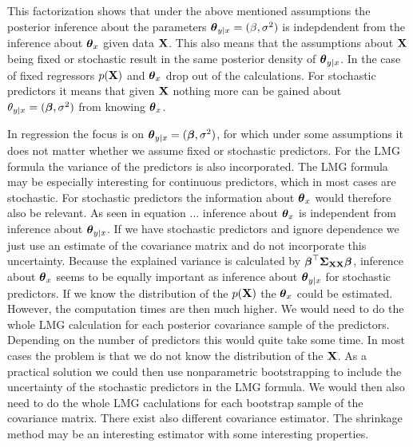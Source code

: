 \documentclass[11pt,a4paper,twoside]{book}\usepackage[]{graphicx}\usepackage[]{color}
\begin{document}
  This factorization shows that under the above mentioned assumptions the posterior inference about the parameters ${\boldsymbol{\theta}}{}_{y \mid x} = (\beta, \sigma^2)$ is indepdendent from the inference about ${\boldsymbol{\theta}}{}_{x}$ given data ${\mathbf{X}}$. This also means that the assumptions about ${\mathbf{X}}$ being fixed or stochastic result in the same posterior density of  ${\boldsymbol{\theta}}{}_{y \mid x}$. In the case of fixed regressors $p({\mathbf{X}})$ and ${\boldsymbol{\theta}}{}_{x}$ drop out of the calculations. For stochastic predictors it means that given ${\mathbf{X}}$ nothing more can be gained about $\theta_{y \mid x} = ({\boldsymbol{\beta}}, \sigma^2)$ from knowing ${\boldsymbol{\theta}}{}_{x}$. 
  
  In regression the focus is on ${\boldsymbol{\theta}}{}_{y \mid x} = ({\boldsymbol{\beta}}, \sigma^2)$, for which under some assumptions it does not matter whether we assume fixed or stochastic predictors. For the LMG formula the variance of the predictors is also incorporated. The LMG formula may be especially interesting for continuous predictors, which in most cases are stochastic. For stochastic predictors the information about ${\boldsymbol{\theta}}{}_{x}$ would therefore also be relevant.  As seen in equation ... inference about ${\boldsymbol{\theta}}{}_{x}$  is independent from inference about ${\boldsymbol{\theta}}{}_{y \mid x}$. If we have stochastic predictors and ignore dependence we just use an estimate of the covariance matrix and do not incorporate this uncertainty.  Because the explained variance is calculated by ${\boldsymbol{\beta}}^\top {\boldsymbol{\Sigma}}{}_{{\mathbf{X}} {\mathbf{X}}}  {\boldsymbol{\beta}}$, inference about  ${\boldsymbol{\theta}}{}_{x}$  seems to be equally important as inference about ${\boldsymbol{\theta}}{}_{y \mid x}$ for stochastic predictors. If we know the distribution of the $p({\mathbf{X}})$ the ${\boldsymbol{\theta}}{}_{x}$ could be estimated. However, the computation times are then much higher. We would need to do the whole LMG calculation for each posterior covariance sample of the predictors. Depending on the number of predictors this would quite take some time.  In most cases the problem is that we do not know the distribution of the ${\mathbf{X}}$. As a practical solution we could then use nonparametric bootstrapping to include the uncertainty of the stochastic predictors in the LMG formula. We would then also need to do the whole LMG caclulations for each bootstrap sample of the covariance matrix. There exist also different covariance estimator. The shrinkage method may be an interesting estimator with some interesting properties. 
  
  
  
 
 
  
  
  
  
  
  
\end{document}
